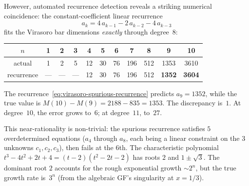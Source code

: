 However, automated recurrence detection reveals a striking numerical
coincidence: the constant-coefficient linear recurrence
\begin{equation}\label{eq:virasoro-spurious-recurrence}
a_k = 4\,a_{k-1} - 2\,a_{k-2} - 4\,a_{k-3}
\end{equation}
fits the Virasoro bar dimensions \emph{exactly} through degree~$8$:

\begin{center}
\renewcommand{\arraystretch}{1.2}
\begin{tabular}{c|cccccccccc}
$n$ & 1 & 2 & 3 & 4 & 5 & 6 & 7 & 8 & 9 & 10 \\
\hline
actual & 1 & 2 & 5 & 12 & 30 & 76 & 196 & 512 & 1353 & 3610 \\
recurrence & --- & --- & --- & 12 & 30 & 76 & 196 & 512 & \textbf{1352} & \textbf{3604}
\end{tabular}
\end{center}

The recurrence~\eqref{eq:virasoro-spurious-recurrence} predicts $a_9 = 1352$,
while the true value is $M(10) - M(9) = 2188 - 835 = 1353$.  The discrepancy
is~$1$.  At degree~$10$, the error grows to~$6$; at degree~$11$, to~$27$.

This near-rationality is non-trivial: the spurious recurrence satisfies
$5$ overdetermined equations ($a_4$ through $a_8$, each being a
linear constraint on the $3$ unknowns $c_1, c_2, c_3$), then
fails at the $6$th.  The characteristic polynomial
$t^3 - 4t^2 + 2t + 4 = (t-2)(t^2 - 2t - 2)$ has roots
$2$ and $1 \pm \sqrt{3}$.  The dominant root $2$ accounts for the
rough exponential growth $\sim 2^n$, but the true growth rate is~$3^n$
(from the algebraic GF's singularity at $x = 1/3$).

